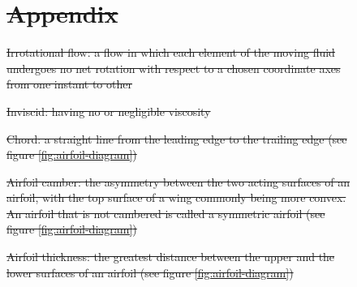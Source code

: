 \documentclass[journal]{new-aiaa} %
\providecommand{\DIFdel}[1]{{\protect\color{red}\sout{#1}}}                      %
\begin{document}
\begin{figure}[H]

\section{\DIFdel{Appendix}}
\addtocounter{section}{-1}%

\item%
\DIFdel{Irrotational flow: a flow in which each element of the moving fluid undergoes no net rotation with respect to a chosen coordinate axes from one instant to other
		}%
\item%
\DIFdel{Inviscid: having no or negligible viscosity
		}%
\item%
\DIFdel{Chord: a straight line from the leading edge to the trailing edge (see figure \ref{fig:airfoil-diagram})
		}%
\item%
\DIFdel{Airfoil camber: the asymmetry between the two acting surfaces of an airfoil, with the top surface of a wing commonly being more convex. An airfoil that is not cambered is called a symmetric airfoil (see figure \ref{fig:airfoil-diagram})
		}%
\item%
\DIFdel{Airfoil thickness: the greatest distance between the upper and the lower surfaces of an airfoil (see figure \ref{fig:airfoil-diagram})
		}%


\end{figure}
\end{document}
